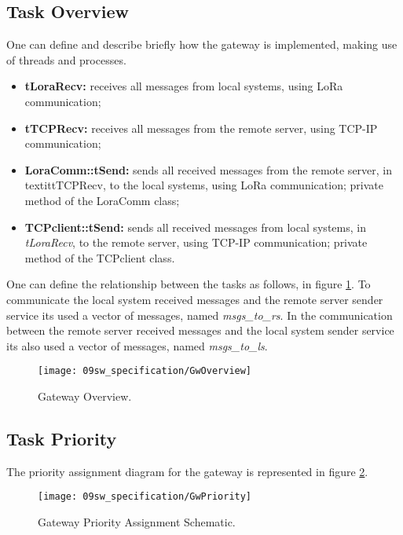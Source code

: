 \subsection{Task Overview}
One can define and describe briefly how the gateway is implemented, making use of threads and processes.

\begin{itemize}
	\item \textbf{tLoraRecv: } receives all messages from local systems, using LoRa communication;
	\item \textbf{tTCPRecv: } receives all messages from the remote server, using TCP-IP communication;	
	\item \textbf{LoraComm::tSend: } sends all received messages from the remote server, in textit{tTCPRecv}, to the local systems, using LoRa communication; private method of the LoraComm class;
	\item \textbf{TCPclient::tSend: } sends all received messages from local systems, in \textit{tLoraRecv}, to the remote server, using TCP-IP communication; private method of the TCPclient class.
\end{itemize}

One can define the relationship between the tasks as follows, in figure \ref{fig:GwOverview}. To communicate the local system received messages and the remote server sender service its used a vector of messages, named \textit{msgs\_to\_rs}. In the communication between the remote server received messages and the local system sender service its also used a vector of messages, named \textit{msgs\_to\_ls}.

\begin{figure}[H]
	\centering
	\texttt{[image: 09sw\_specification/GwOverview]}
	\caption{Gateway Overview.}
	\label{fig:GwOverview}
\end{figure}

\clearpage
\subsection{Task Priority}
The priority assignment diagram for the gateway is represented in figure \ref{fig:gwt_priority}.

\begin{figure}[H]
	\centering
	\texttt{[image: 09sw\_specification/GwPriority]}
	\caption{Gateway Priority Assignment Schematic.}
	\label{fig:gwt_priority}
\end{figure}


